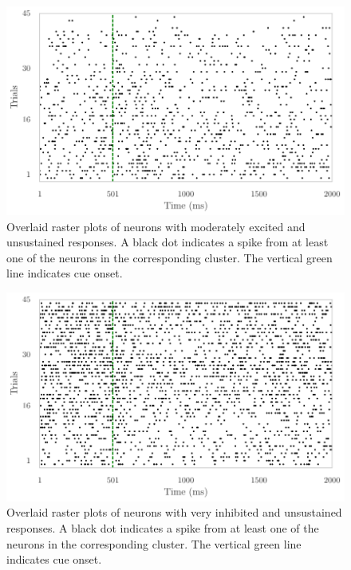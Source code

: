 \documentclass{article}
\begin{document}
\begin{figure}[H]
\begin{center}
\includegraphics[scale=1]{img/cue_1.pdf}
\end{center}
\caption{Overlaid raster plots of neurons with moderately excited and unsustained responses. A black dot indicates a spike from at least one of the neurons in the corresponding cluster. The vertical green line indicates cue onset.}\label{cue1-raster}
\end{figure}

\begin{figure}[H]
\begin{center}
\includegraphics[scale=1]{img/cue_4.pdf}
\end{center}
\caption{Overlaid raster plots of neurons with very inhibited and unsustained responses. A black dot indicates a spike from at least one of the neurons in the corresponding cluster. The vertical green line indicates cue onset.}\label{cue4-raster}
\end{figure}
\end{document}
